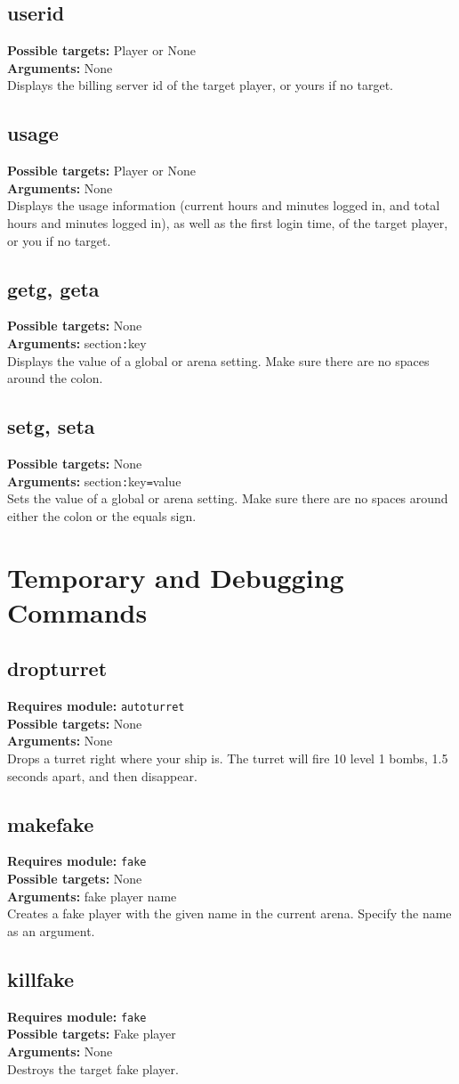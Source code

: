 \documentclass{article}
\newcommand{\requiremod}[1]{\noindent\textbf{Requires module:} \texttt{#1}\\}
\newcommand{\targets}[1]{\noindent\textbf{Possible targets:} #1\\}
\newcommand{\args}[1]{\noindent\textbf{Arguments:} #1\\}
\begin{document}
\subsection{userid}
\targets{Player or None}
\args{None}
Displays the billing server id of the target player, or yours if no
target.

\subsection{usage}
\targets{Player or None}
\args{None}
Displays the usage information (current hours and minutes logged in, and
total hours and minutes logged in), as well as the first login time, of
the target player, or you if no target.


\subsection{getg, geta}
\targets{None}
\args{section\texttt{:}key}
Displays the value of a global or arena setting. Make sure there are no
spaces around the colon.

\subsection{setg, seta}
\targets{None}
\args{section\texttt{:}key\texttt{=}value}
Sets the value of a global or arena setting. Make sure there are no
spaces around either the colon or the equals sign.


\section{Temporary and Debugging Commands}

\subsection{dropturret}  %
\requiremod{autoturret}
\targets{None}
\args{None}
Drops a turret right where your ship is. The turret will fire 10 level 1
bombs, 1.5 seconds apart, and then disappear.

\subsection{makefake}  %
\requiremod{fake}
\targets{None}
\args{fake player name}
Creates a fake player with the given name in the current arena. Specify
the name as an argument.

\subsection{killfake}  %
\requiremod{fake}
\targets{Fake player}
\args{None}
Destroys the target fake player.
\end{document}
